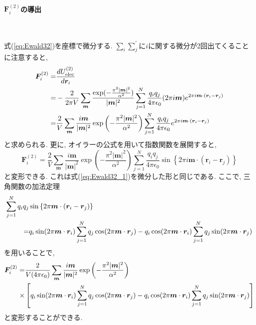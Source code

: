 \paragraph{$\bm{F}_{i}^{(2)}$の導出} \

式(\ref{eq:Ewald32})を座標で微分する.
$\sum_{i}\sum_{j}^{\prime}$に$i$に関する微分が2回出てくることに注意すると,
\begin{align}
 \bm{F}_{i}^{(2)}
 =&
   \frac{d U_{\mathrm{elec}}^{(2)}}{d \bm{r}_{i}}
 \notag
 \\
 =&
   -\frac{2}{2 \pi V} \sum_{\bm{m}}
    \frac{\exp( -\frac{\pi^{2} |\bm{m}|^{2}}{\alpha^{2}})}{|\bm{m}|^{2}}
    \sum_{j=1}^{N}
    \frac{q_{i}q_{j} }{4 \pi \epsilon_{0}}
    (2 \pi i \bm{m})
    e^{2 \pi i \bm{m} \cdot (\bm{r}_{i} - \bm{r}_{j})}
 \notag
 \\
  =&
    \frac{2}{V}
    \sum_{\bm{m}} \frac{i \bm{m}}{|\bm{m}|^{2}}
    \exp\left(-\frac{\pi^{2} |\bm{m}|^{2}}{\alpha^{2}}\right)
    \sum_{j=1}^{N}
    \frac{q_{i}q_{j} }{4 \pi \epsilon_{0}}
    e^{2 \pi i \bm{m} \cdot (\bm{r}_{i} - \bm{r}_{j})}
\end{align}
と求められる. 更に, オイラーの公式を用いて指数関数を展開すると,
\begin{equation}
  \bm{F}_{i}^{(2)}
 =
  \frac{2}{V}
  \sum_{\bm{m}} \frac{i \bm{m}}{|\bm{m}|^{2}}
  \exp\left(-\frac{\pi^{2} |\bm{m}|^{2}}{\alpha^{2}}\right)
  \sum_{j=1}^{N}
  \frac{q_{i}q_{j} }{4 \pi \epsilon_{0}}
  \sin \left\{2 \pi i \bm{m} \cdot (\bm{r}_{i} - \bm{r}_{j}) \right\}
\end{equation}
と変形できる. これは式(\ref{eq:Ewald32_1})を微分した形と同じである.
ここで, 三角関数の加法定理
\begin{align}
  \sum_{j=1}^{N} q_{i} q_{j}
 &
  \sin\left\{ 2 \pi \bm{m} \cdot (\bm{r}_{i} - \bm{r}_{j}) \right\}
 \notag
 \\
=&
   q_{i} \sin(2 \pi \bm{m} \cdot \bm{r}_{i})
   \sum_{j=1}^{N} q_{j} \cos(2 \pi \bm{m} \cdot \bm{r}_{j})
  -
   q_{i} \cos(2 \pi \bm{m} \cdot \bm{r}_{i})
   \sum_{j=1}^{N} q_{j} \sin(2 \pi \bm{m} \cdot \bm{r}_{j})
\end{align}
を用いることで,
\begin{align}
  \bm{F}_{i}^{(2)}
=&
  \frac{2}{V(4 \pi \epsilon_{0})}
  \sum_{\bm{m}} \frac{i \bm{m}}{|\bm{m}|^{2}}
  \exp\left(-\frac{\pi^{2} |\bm{m}|^{2}}{\alpha^{2}}\right)
 \notag
 \\
 \times&
 \left[
   q_{i} \sin(2 \pi \bm{m} \cdot \bm{r}_{i})
   \sum_{j=1}^{N} q_{j} \cos(2 \pi \bm{m} \cdot \bm{r}_{j})
  -
   q_{i} \cos(2 \pi \bm{m} \cdot \bm{r}_{i})
   \sum_{j=1}^{N} q_{j} \sin(2 \pi \bm{m} \cdot \bm{r}_{j})
 \right]
\end{align}
と変形することができる.

